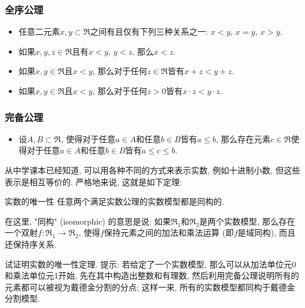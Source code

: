 \subsubsection{全序公理}
\begin{itemize}
\item 任意二元素$x,y\subset\mathfrak{R}$之间有且仅有下列三种关系之一: $x<y$, $x=y$, $x>y$.
\item 如果$x,y,z\in\mathfrak{R}$且有$x<y$, $y<z$, 那么$x<z$.
\item 如果$x,y\in\mathfrak{R}$且$x<y$, 那么对于任何$z\in\mathfrak{R}$皆有$x+z<y+z$.
\item 如果$x,y\in\mathfrak{R}$且$x<y$, 那么对于任何$z>0$皆有$x\cdot z<y\cdot z$.
\end{itemize}

\subsubsection{完备公理}
\begin{itemize}
\item 设$A,B\subset\mathfrak{R}$, 使得对于任意$a\in A$和任意$b\in B$皆有$a\leq b$, 那么存在元素$c\in\mathfrak{R}$使得对于任意$a\in A$和任意$b\in B$皆有$a\leq c\leq b$.
\end{itemize}

从中学课本已经知道, 可以用各种不同的方式来表示实数, 例如十进制小数, 但这些表示是相互等价的. 严格地来说, 这就是如下定理:
\begin{theorem}{实数的唯一性}
任意两个满足实数公理的实数模型都是同构的.
\end{theorem}
在这里, "同构" (isomorphic) 的意思是说: 如果$\mathfrak{R}_1$和$\mathfrak{R}_2$是两个实数模型, 那么存在一个双射$f:\mathfrak{R}_1\to \mathfrak{R}_2$, 使得$f$保持元素之间的加法和乘法运算 (即$f$是域同构), 而且还保持序关系.

\begin{exercise}{}
试证明实数的唯一性定理. 提示: 若给定了一个实数模型, 那么可以从加法单位元0和乘法单位元1开始, 先在其中构造出整数和有理数, 然后利用完备公理说明所有的元素都可以被视为戴德金分割的分点; 这样一来, 所有的实数模型都同构于戴德金分割模型.
\end{exercise}